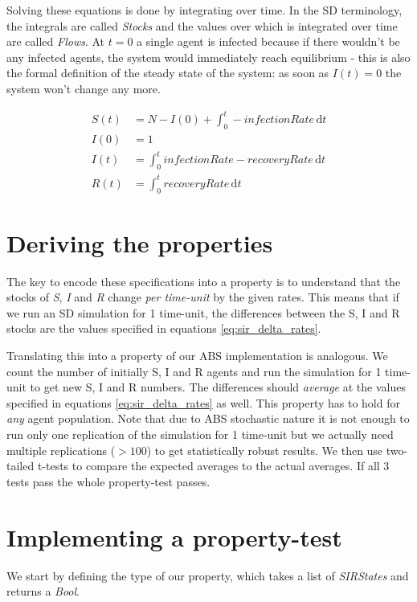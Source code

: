 Solving these equations is done by integrating over time. In the SD terminology, the integrals are called \textit{Stocks} and the values over which is integrated over time are called \textit{Flows}. At $t = 0$ a single agent is infected because if there wouldn't be any infected agents, the system would immediately reach equilibrium - this is also the formal definition of the steady state of the system: as soon as $I(t) = 0$ the system won't change any more.

\begin{align}
S(t) &= N - I(0) + \int_0^t -infectionRate\, \mathrm{d}t \\
I(0) &= 1 \\
I(t) &= \int_0^t infectionRate - recoveryRate\, \mathrm{d}t \\
R(t) &= \int_0^t recoveryRate\, \mathrm{d}t
\end{align}

\section{Deriving the properties}
The key to encode these specifications into a property is to understand that the stocks of \textit{S}, \textit{I} and \textit{R} change \textit{per time-unit} by the given rates. This means that if we run an SD simulation for 1 time-unit, the differences between the S, I and R stocks are the values specified in equations \ref{eq:sir_delta_rates}. %

Translating this into a property of our ABS implementation is analogous. We count the number of initially S, I and R agents and run the simulation for 1 time-unit to get new S, I and R numbers. The differences should \textit{average} at the values specified in equations \ref{eq:sir_delta_rates} as well. This property has to hold for \textit{any} agent population. Note that due to ABS stochastic nature it is not enough to run only one replication of the simulation for 1 time-unit but we actually need multiple replications ($> 100$) to get statistically robust results. We then use two-tailed t-tests to compare the expected averages to the actual averages. If all 3 tests pass the whole property-test passes.

\section{Implementing a property-test}
We start by defining the type of our property, which takes a list of \textit{SIRStates} and returns a \textit{Bool}.


